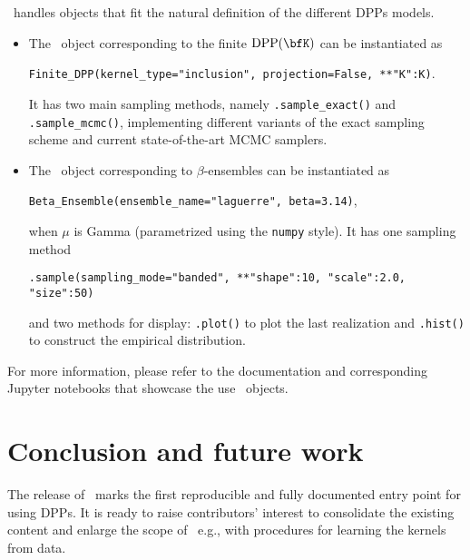 \documentclass[twoside,11pt]{article}
\begin{document}
  \DPPy\ handles objects that fit the natural definition of the different DPPs models.
  \begin{itemize}
	  \item The \DPPy\ object corresponding to the finite $\DPP(\bfK)$ can be instantiated as
	  \begin{nscenter}
	  	\texttt{Finite_DPP(kernel_type="inclusion", projection=False, **{"K":K})}.
	  \end{nscenter}
		It has two main sampling methods, namely \texttt{.sample_exact()} and \texttt{.sample_mcmc()}, implementing different variants of the exact sampling scheme and current state-of-the-art MCMC samplers.

		\item The \DPPy\ object corresponding to $\beta$-ensembles can be instantiated as
		\begin{nscenter}
			\texttt{Beta_Ensemble(ensemble_name="laguerre", beta=3.14)},
		\end{nscenter}
		when $\mu$ is Gamma (parametrized using the \texttt{numpy} style).
		It has one sampling method
		\begin{nscenter}
			\texttt{.sample(sampling_mode="banded", **{"shape":10, "scale":2.0, "size":50})}
		\end{nscenter}
		and two methods for display: \texttt{.plot()} to plot the last realization and \texttt{.hist()} to construct the empirical distribution.
  \end{itemize}

  For more information, please refer to the documentation and corresponding Jupyter notebooks that showcase the use \DPPy\ objects.


\section{Conclusion and future work} %
\label{sec:conclusion_and_future_work}

	The release of \DPPy\ marks the first reproducible and fully documented entry point for using DPPs. It is ready to raise contributors' interest to consolidate the existing content and enlarge the scope of \DPPy\ e.g., with procedures for learning the kernels from data.

\end{document}
